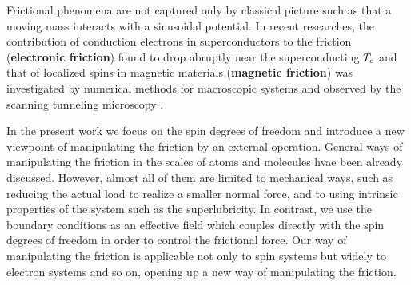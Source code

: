 Frictional phenomena are not captured only by classical picture such as that a moving mass interacts with a sinusoidal potential. In recent researches, the contribution of conduction electrons in superconductors to the friction (\textbf{electronic friction}) found to drop abruptly near the superconducting $T_{\rm c}$ \cite{Dayo1998,Novotny1999,Qi2008} and that of localized spins in magnetic materials (\textbf{magnetic friction}) was investigated by numerical methods for macroscopic systems \cite{Kadau2008,Fusco2008,Magiera2011} and observed by the scanning tunneling microscopy \cite{Wolter2012}.


In the present work we focus on the spin degrees of freedom and introduce a new viewpoint of manipulating the friction by an external operation. General ways of manipulating the friction in the scales of atoms and molecules hvae been already discussed. However, almost all of them are limited to mechanical ways, such as reducing the actual load to realize a smaller normal force, and to using intrinsic properties of the system such as the superlubricity. In contrast, we use the boundary conditions as an effective field which couples directly with the spin degrees of freedom in order to control the frictional force. Our way of manipulating the friction is applicable not only to spin systems but widely to electron systems and so on, opening up a new way of manipulating the friction.


